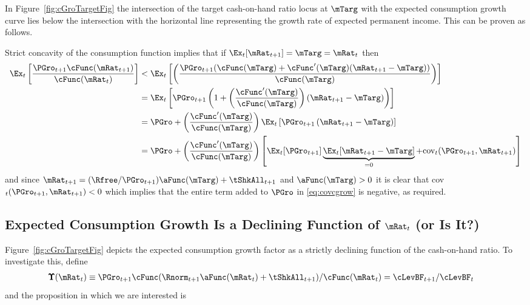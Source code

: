 \documentclass[./BufferStockTheory.tex]{subfiles}
\begin{document}
\label{subsec:expcgrowth} In Figure~\ref{fig:cGroTargetFig} the intersection of
the target cash-on-hand ratio locus at $\mTarg$ with the expected consumption
growth curve lies below the intersection with the horizontal line
representing the growth rate of expected permanent income. This can be
proven as follows.

Strict concavity of the consumption function implies that if $\Ex_{t}[{\mRat}_{t+1}] = \mTarg = \mRat_{t}$ then
\begin{equation}\begin{gathered}\begin{aligned}
\Ex_{t}\left[\frac{{\PGro}_{t+1} \cFunc({\mRat}_{t+1})}{\cFunc(\mRat_{t})}
\right]  & < \Ex_{t}\left[\left(\frac{{\PGro}_{t+1}
(\cFunc(\mTarg)+\cFunc^{\prime}(\mTarg)({\mRat}_{t+1}-\mTarg))}{\cFunc(\mTarg)}\right)\right]  \nonumber \\
 & = \Ex_{t}\left[{\PGro}_{t+1} \left(1+\left(\frac{\cFunc^{\prime}(\mTarg)}{%
\cFunc(\mTarg)}\right)({\mRat}_{t+1}-\mTarg)\right)\right]  \nonumber  \\
 & = \PGro + \left(\frac{\cFunc^{\prime}(\mTarg)}{\cFunc(\mTarg)}\right)\Ex_{t}\left[ {\PGro}_{t+1}\left({\mRat}_{t+1}-\mTarg\right)\right]  \nonumber \\
 & = \PGro + \left(\frac{\cFunc^{\prime}(\mTarg)}{\cFunc(\mTarg)}\right)\left[
\Ex_{t}[ \PGro_{t+1}]\underbrace{\Ex_{t}[
{\mRat}_{t+1}-\mTarg]}_{=0}+\mbox{cov}_{t}( {\PGro}_{t+1},{\mRat}_{t+1})\right]
 \label{eq:covcgrow}
\end{aligned}\end{gathered}\end{equation}
and since $\mRat_{t+1} = (\Rfree/\PGro_{t+1}) \aFunc(\mTarg)+\tShkAll_{t+1}$ and
$\aFunc(\mTarg)>0$ it is clear that
cov$_{t}({\PGro}_{t+1},{\mRat}_{t+1})<0$ which implies that
the entire term added to $\PGro$ in \eqref{eq:covcgrow} is negative, as
required.

\hypertarget{dcgdxneg}{}
\subsection{Expected Consumption Growth Is a Declining Function of $\mRat_{t}$ (or Is It?)}
\label{subsec:dcgdxneg}

Figure~\ref{fig:cGroTargetFig} depicts the expected consumption growth factor as a strictly
declining function of the cash-on-hand ratio. To investigate this,
define
\begin{align*}
\pmb{\Upsilon}(\mRat_{t})  & \equiv  \PGro_{t+1} \cFunc(\Rnorm_{t+1}\aFunc(\mRat_{t})+\tShkAll_{t+1})/\cFunc(\mRat_{t})  = \cLevBF_{t+1}/\cLevBF_{t}
\end{align*}
and the proposition in which we are interested is
\end{document}
